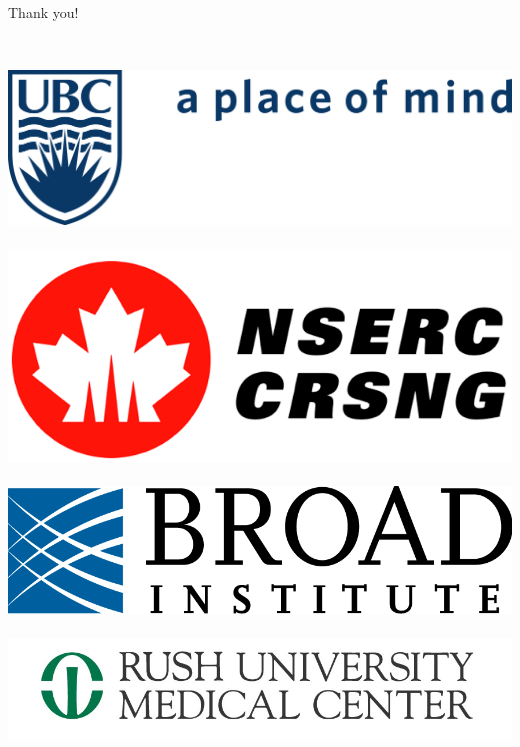 \documentclass{beamer}
\begin{document}
\begin{frame}{Thank you!}
\begin{columns}
\begin{column}{0.5\textwidth}
\begin{center}
                \hfill\\
                \includegraphics[scale=0.2]{logos/ubc} \\
                \hfill\\
                \includegraphics[scale=0.1]{logos/nserc} \\
                \hfill\\
                \includegraphics[scale=0.1]{logos/broad} \\
                \hfill\\
                \includegraphics[scale=0.1]{logos/rush}
            \end{center}
        \end{column}
    \end{columns}
\end{frame}
\end{document}
